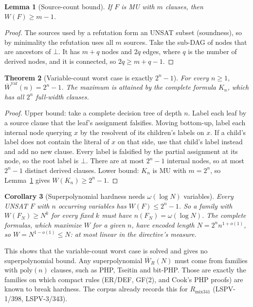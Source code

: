 \documentclass[11pt]{article}
\newtheorem{theorem}{Theorem}
\newtheorem{lemma}[theorem]{Lemma}
\newtheorem{corollary}[theorem]{Corollary}
\begin{document}
\begin{lemma}[Source-count bound]\label{l:src} If $F$ is MU with $m$ clauses, then $W(F)\ge m-1$.\end{lemma}
\begin{proof}The sources used by a refutation form an UNSAT subset (soundness), so by minimality the refutation uses all $m$ sources.
Take the sub-DAG of nodes that are ancestors of $\bot$. It has $m+q$ nodes and $2q$ edges, where $q$ is the number of derived nodes,
and it is connected, so $2q\ge m+q-1$.\end{proof}

\begin{theorem}[Variable-count worst case is exactly $2^n-1$]\label{t:var}
For every $n\ge1$, $\overline W^{\mathrm{var}}(n)=2^n-1$.
The maximum is attained by the complete formula $K_n$, which has all $2^n$ full-width clauses.
\end{theorem}
\begin{proof}
Upper bound: take a complete decision tree of depth $n$. Label each leaf by a source clause that the leaf's assignment falsifies.
Moving bottom-up, label each internal node querying $x$ by the resolvent of its children's labels on $x$. If a child's label does not
contain the literal of $x$ on that side, use that child's label instead and add no new clause. Every label is falsified by the partial
assignment at its node, so the root label is $\bot$. There are at most $2^n-1$ internal nodes, so at most $2^n-1$ distinct derived clauses.
Lower bound: $K_n$ is MU with $m=2^n$, so Lemma~\ref{l:src} gives $W(K_n)\ge 2^n-1$.
\end{proof}

\begin{corollary}[Superpolynomial hardness needs $\omega(\log N)$ variables]\label{c:N}
Every UNSAT $F$ with $n$ occurring variables has $W(F)\le 2^n-1$. So a family with $W(F_N)\ge N^{k}$ for every fixed $k$ must have
$n(F_N)=\omega(\log N)$. The complete formulas, which maximize $W$ for a given $n$, have encoded length $N=2^{n}n^{1+o(1)}$, so $W=N^{1-o(1)}\le N$:
at most linear in the directive's measure.
\end{corollary}
This shows that the variable-count worst case is solved and gives no superpolynomial bound. Any superpolynomial
$\overline W_R(N)$ must come from families with $\mathrm{poly}(n)$ clauses, such as PHP, Tseitin and bit-PHP. Those are exactly the
families on which compact rules (ER/DEF, GF(2), and Cook's PHP proofs) are known to break hardness. The corpus already records this for
$R_{\mathrm{mix341}}$ (LSPV-1/398, LSPV-3/343).
\end{document}
